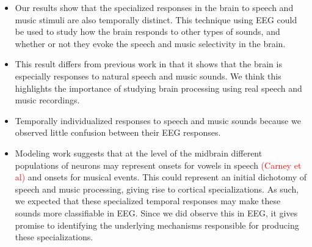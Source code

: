 \documentclass[11pt]{article}
\begin{document}
\begin{itemize}
\item Our results show that the specialized responses in the brain to speech and music stimuli are also temporally distinct.  This technique using EEG could be used to study how the brain responds to other types of sounds, and whether or not they evoke the speech and music selectivity in the brain.
\item This result differs from previous work in that it shows that the brain is especially responses to natural speech and music sounds.  We think this highlights the importance of studying brain processing using real speech and music recordings.
\item Temporally individualized responses to speech and music sounds because we observed little confusion between their EEG responses.
\item Modeling work suggests that at the level of the midbrain different populations of neurons may represent onsets for vowels in speech \textcolor{red}{(Carney et al)} and onsets for musical events.  This could represent an initial dichotomy of speech and music processing, giving rise to cortical specializations.  As such, we expected that these specialized temporal responses may make these sounds more classifiable in EEG.  Since we did observe this in EEG, it gives promise to identifying the underlying mechanisms responsible for producing these specializations.
\end{itemize}
\end{document}
